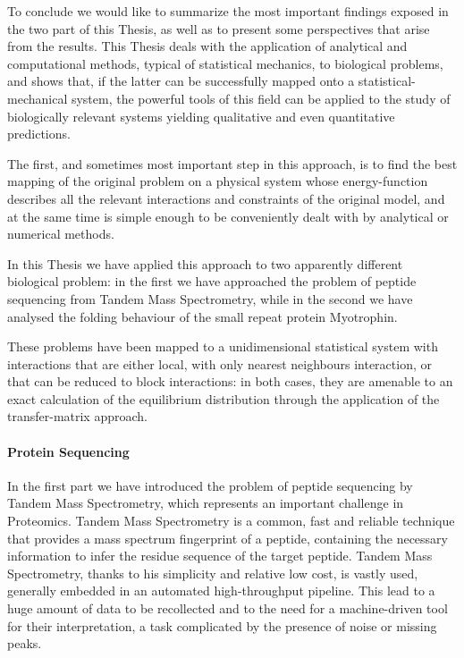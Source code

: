 

To conclude we would like to summarize  the most important findings exposed in the
two part of this Thesis,  as well as to present some perspectives that arise from
the results.
This Thesis deals with the  application of
analytical and computational methods, typical of statistical mechanics, to
biological problems, and shows that, if the latter can be 
successfully mapped onto a statistical-mechanical system,
the powerful tools of this field can be applied to the study of biologically relevant systems 
yielding   qualitative and even quantitative predictions.

The first, and sometimes most important step in this approach,
is to find  the best mapping of the original problem on a physical system whose   
energy-function describes all the relevant interactions and constraints of the original model, and at the same time is simple enough to be conveniently  dealt with by analytical or numerical methods.

In this Thesis we have applied this approach to two apparently different
biological problem: in the first we have approached the problem of  peptide
sequencing from Tandem Mass Spectrometry, while in the second we have
analysed the folding behaviour of the small repeat protein Myotrophin.

These problems have been mapped to a unidimensional statistical system with interactions that are either local, with only
nearest neighbours interaction, or that can be reduced to block interactions: in both cases, they are amenable  
to an exact calculation of the equilibrium
distribution through the application of the transfer-matrix approach. 

\paragraph{Protein Sequencing}
In the first part we have introduced the problem of peptide sequencing by Tandem
Mass Spectrometry, which represents an important challenge in Proteomics. 
Tandem Mass Spectrometry is a common, fast  and reliable technique that provides a mass spectrum
fingerprint of a peptide, containing the necessary information to infer the
residue sequence of the target peptide.
Tandem Mass Spectrometry, thanks to his simplicity and relative low cost, is vastly used,
generally embedded in an automated high-throughput pipeline.
This lead to a huge amount of data to be recollected and to the need for a machine-driven
tool for their interpretation, a task complicated by the presence of noise or missing peaks.

